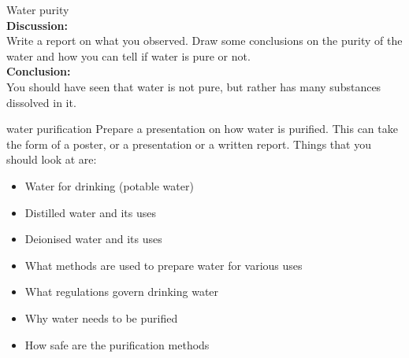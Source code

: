\begin{g_experiment}{Water purity}
\\
\label{m38138*id3429827}\noindent{}\textbf{Discussion:}\\
Write a report on what you observed. Draw some conclusions on the purity of the water and how you can tell if water is pure or not.
\\  
\label{m38138*id68921}\noindent{}\textbf{Conclusion:}\\
    You should have seen that water is not pure, but rather has many substances dissolved in it.
\\
\end{g_experiment}
\label{m38138*id672214}
            \begin{project}{water purification}
            \nopagebreak
\label{m38138*id97324}
Prepare a presentation on how water is purified. This can take the form of a poster, or a presentation or a written report. Things that you should look at are:
\label{m38138*id097324}\begin{itemize}[noitemsep]
            \item Water for drinking (potable water)\item Distilled water and its uses\item Deionised water and its uses\item What methods are used to prepare water for various uses\item What regulations govern drinking water\item Why water needs to be purified\item How safe are the purification methods\end{itemize}
\par 
\end{project}
